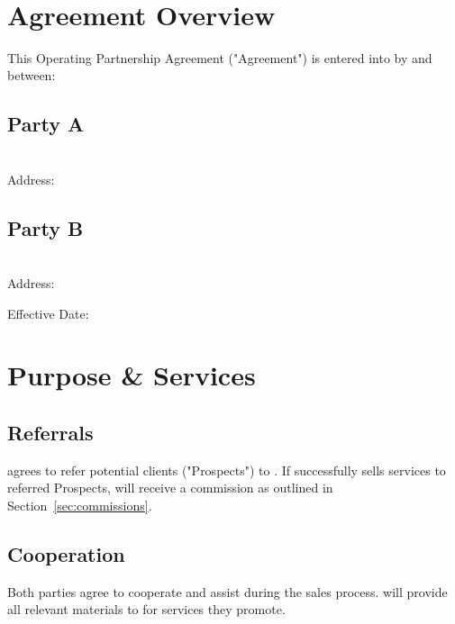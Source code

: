 \documentclass[12pt]{article}
\begin{document}
\begin{center}
  \vspace*{-1cm}
  {\Large\bfseries \agreementTitle}\\[1em]
\end{center}


\section{Agreement Overview}
This Operating Partnership Agreement ("Agreement") is entered into by and between:

\subsection*{Party A}
\textbf{\partyA}\\
Address: \textbf{\partyAaddress}

\subsection*{Party B}
\textbf{\partyB}\\
Address: \textbf{\partyBaddress}

Effective Date: \textbf{\effectiveDate}

\newpage

\section{Purpose \& Services}
\subsection{Referrals}
\partyAshort{} agrees to refer potential clients ("Prospects") to \partyBshort{}.  
If \partyBshort{} successfully sells services to referred Prospects, \partyAshort{} will receive a commission as outlined in Section~\ref{sec:commissions}.

\subsection{Cooperation}
Both parties agree to cooperate and assist during the sales process.  
\partyBshort{} will provide all relevant materials to \partyAshort{} for services they promote.
\end{document}
